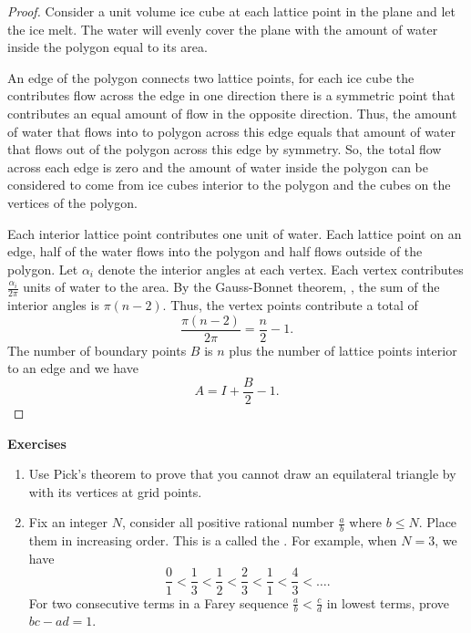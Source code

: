 \begin{proof}
	Consider a unit volume ice cube at each lattice point in the plane and let the ice melt.
	The water will evenly cover the plane with the amount of water inside the polygon 
	equal to its area.
	
	An edge of the polygon connects two lattice points,
	for each ice cube the contributes flow across the edge in one direction there is a symmetric
	point that contributes an equal amount of flow in the opposite direction. Thus, 
	the amount of water that flows
	into to polygon across this edge equals that amount of water that flows out of the polygon
	across this edge by symmetry.
	So, the total flow across each edge is zero and
	the amount of water inside the polygon can be considered to come from ice cubes interior to the polygon and the cubes on the vertices
	of the polygon.
	
	Each interior lattice point contributes one unit of water. 
	Each lattice point on an edge, half of the water flows into the polygon and
	half flows outside of the polygon.
	Let $\alpha_i$ denote the interior angles at each vertex.
	Each vertex contributes $\frac{\alpha_i}{2\pi}$ units of water to the area.
	By the Gauss-Bonnet theorem, , the sum of the interior
	angles is $\pi(n-2)$. Thus, the vertex points contribute a total of 
	$$\frac{\pi(n-2)}{2\pi}=\frac{n}{2}-1.$$
	The number of boundary points $B$ is $n$ plus the number of lattice points interior to an edge
	and we have
	$$A=I+\frac{B}{2}-1.$$
	
\end{proof}


\noindent \textbf{Exercises}


\begin{enumerate}
	\item Use Pick's theorem to prove that you cannot draw an equilateral triangle by with its vertices
	at grid points.
	
	\item Fix an integer $N$, consider all positive rational number $\frac{a}{b}$ where
	$b\leq N$. Place them in increasing order. This is a called the .
	For example, when $N=3$, we have
	$$\frac{0}{1}<\frac{1}{3}<\frac{1}{2}<\frac{2}{3}<\frac{1}{1}<\frac{4}{3}<\ldots.$$
	For two consecutive terms in a Farey sequence $\frac{a}{b}<\frac{c}{d}$ in lowest terms,
	prove $bc-ad=1.$
	
\end{enumerate}

\pagebreak
